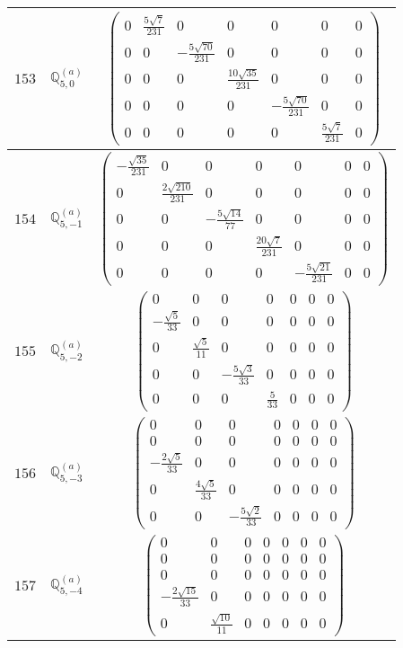 \documentclass[fleqn,8pt,landscape]{jsarticle}
\begin{document}
\begin{center}
\begin{longtable}{ccc}
$ 153 $ & $ \mathbb{Q}_{5,0}^{(a)} $ & $ \begin{pmatrix} 0 & \frac{5 \sqrt{7}}{231} & 0 & 0 & 0 & 0 & 0 \\ 0 & 0 & - \frac{5 \sqrt{70}}{231} & 0 & 0 & 0 & 0 \\ 0 & 0 & 0 & \frac{10 \sqrt{35}}{231} & 0 & 0 & 0 \\ 0 & 0 & 0 & 0 & - \frac{5 \sqrt{70}}{231} & 0 & 0 \\ 0 & 0 & 0 & 0 & 0 & \frac{5 \sqrt{7}}{231} & 0 \end{pmatrix} $ \\ \hline
$ 154 $ & $ \mathbb{Q}_{5,-1}^{(a)} $ & $ \begin{pmatrix} - \frac{\sqrt{35}}{231} & 0 & 0 & 0 & 0 & 0 & 0 \\ 0 & \frac{2 \sqrt{210}}{231} & 0 & 0 & 0 & 0 & 0 \\ 0 & 0 & - \frac{5 \sqrt{14}}{77} & 0 & 0 & 0 & 0 \\ 0 & 0 & 0 & \frac{20 \sqrt{7}}{231} & 0 & 0 & 0 \\ 0 & 0 & 0 & 0 & - \frac{5 \sqrt{21}}{231} & 0 & 0 \end{pmatrix} $ \\ \hline
$ 155 $ & $ \mathbb{Q}_{5,-2}^{(a)} $ & $ \begin{pmatrix} 0 & 0 & 0 & 0 & 0 & 0 & 0 \\ - \frac{\sqrt{5}}{33} & 0 & 0 & 0 & 0 & 0 & 0 \\ 0 & \frac{\sqrt{5}}{11} & 0 & 0 & 0 & 0 & 0 \\ 0 & 0 & - \frac{5 \sqrt{3}}{33} & 0 & 0 & 0 & 0 \\ 0 & 0 & 0 & \frac{5}{33} & 0 & 0 & 0 \end{pmatrix} $ \\ \hline
$ 156 $ & $ \mathbb{Q}_{5,-3}^{(a)} $ & $ \begin{pmatrix} 0 & 0 & 0 & 0 & 0 & 0 & 0 \\ 0 & 0 & 0 & 0 & 0 & 0 & 0 \\ - \frac{2 \sqrt{5}}{33} & 0 & 0 & 0 & 0 & 0 & 0 \\ 0 & \frac{4 \sqrt{5}}{33} & 0 & 0 & 0 & 0 & 0 \\ 0 & 0 & - \frac{5 \sqrt{2}}{33} & 0 & 0 & 0 & 0 \end{pmatrix} $ \\ \hline
$ 157 $ & $ \mathbb{Q}_{5,-4}^{(a)} $ & $ \begin{pmatrix} 0 & 0 & 0 & 0 & 0 & 0 & 0 \\ 0 & 0 & 0 & 0 & 0 & 0 & 0 \\ 0 & 0 & 0 & 0 & 0 & 0 & 0 \\ - \frac{2 \sqrt{15}}{33} & 0 & 0 & 0 & 0 & 0 & 0 \\ 0 & \frac{\sqrt{10}}{11} & 0 & 0 & 0 & 0 & 0 \end{pmatrix} $ \\ \hline

\end{longtable}
\end{center}
\end{document}
